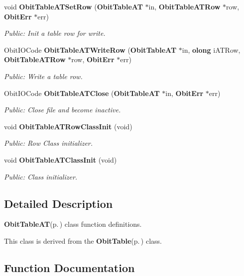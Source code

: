 \begin{CompactItemize}
void {\bf Obit\-Table\-ATSet\-Row} ({\bf Obit\-Table\-AT} $\ast$in, {\bf Obit\-Table\-ATRow} $\ast$row, {\bf Obit\-Err} $\ast$err)
\begin{CompactList}\small\item\em Public: Init a table row for write. \item\end{CompactList}\item 
Obit\-IOCode {\bf Obit\-Table\-ATWrite\-Row} ({\bf Obit\-Table\-AT} $\ast$in, {\bf olong} i\-ATRow, {\bf Obit\-Table\-ATRow} $\ast$row, {\bf Obit\-Err} $\ast$err)
\begin{CompactList}\small\item\em Public: Write a table row. \item\end{CompactList}\item 
Obit\-IOCode {\bf Obit\-Table\-ATClose} ({\bf Obit\-Table\-AT} $\ast$in, {\bf Obit\-Err} $\ast$err)
\begin{CompactList}\small\item\em Public: Close file and become inactive. \item\end{CompactList}\item 
void {\bf Obit\-Table\-ATRow\-Class\-Init} (void)
\begin{CompactList}\small\item\em Public: Row Class initializer. \item\end{CompactList}\item 
void {\bf Obit\-Table\-ATClass\-Init} (void)
\begin{CompactList}\small\item\em Public: Class initializer. \item\end{CompactList}\end{CompactItemize}


\subsection{Detailed Description}
{\bf Obit\-Table\-AT}{\rm (p.\,\pageref{structObitTableAT})} class function definitions. 

This class is derived from the {\bf Obit\-Table}{\rm (p.\,\pageref{structObitTable})} class.

\subsection{Function Documentation}
